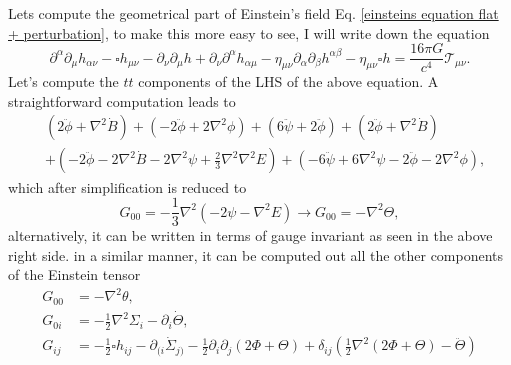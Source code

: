 \documentclass{article}
\begin{document}
Lets compute the geometrical part of Einstein's field Eq. 
\eqref{einsteins equation flat + perturbation}, to make this more easy to see, I will write 
down the equation
\begin{equation}
        \partial^{\alpha}\partial_{\mu}h_{\alpha\nu} 
        -  \square h_{\mu\nu} - \partial_{\nu}\partial_{\mu}h
        + \partial_{\nu}\partial^{\alpha}h_{\alpha\mu}
        - \eta_{\mu\nu}\partial_{\alpha}\partial_{\beta}h^{\alpha\beta} 
        - \eta_{\mu\nu}\square h = \frac{16\pi G}{c^4}\mathcal{T}_{\mu\nu}.
\end{equation}
Let's compute the $tt$ components of the LHS of the above equation. A straightforward
computation leads to
\begin{align}
    & \left(2\ddot{\phi} + \nabla^{2}\dot{B}\right) + \left(-2\ddot{\phi} + 2\nabla^2\phi\right)
    + \left(6\ddot{\psi} + 2\ddot{\phi}\right) + \left(2\ddot{\phi} + \nabla^2\dot{B}\right)\\
    & + \left(-2\ddot{\phi} - 2\nabla^2 \dot{B} -2\nabla^2\psi + \frac{2}{3}\nabla^2\nabla^2E\right)
    +\left(-6\ddot{\psi} + 6\nabla^2\psi -2\ddot{\phi} - 2\nabla^2\phi\right), 
\end{align}
which after simplification is reduced to
\begin{equation}
    G_{00} = -\frac{1}{3}\nabla^2\left(-2\psi - \nabla^2 E\right) \to
    G_{00} = -\nabla^2\Theta,
\end{equation}
alternatively, it can be written in terms of gauge invariant as seen in the above right side. in
a similar manner, it can be computed out all the other components of the Einstein tensor
\begin{align}
    G_{00} & = -\nabla^2\theta, \\
    G_{0i} & = -\frac{1}{2}\nabla^2\Sigma_i -\partial_{i}\dot{\Theta},\\
    G_{ij} & = -\frac{1}{2}\square h_{ij} - \partial_{(i}\dot{\Sigma}_{j)} - \frac{1}{2}\partial_{i}
    \partial_{j}\left(2\Phi + \Theta\right) + \delta_{ij}\left(\frac{1}{2}\nabla^2\left(2\Phi + \Theta\right)
    - \ddot{\Theta} \right)
\end{align}
\end{document}
